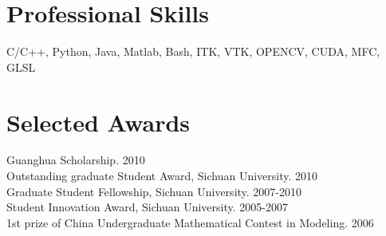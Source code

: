 \documentclass[line,margin]{res}
\begin{document}
\begin{resume}
\section{\sc Professional Skills}
\smallskip

C/C++, Python, Java, Matlab, Bash, ITK, VTK, OPENCV, CUDA, MFC, GLSL
 
\section{\sc Selected Awards}


Guanghua Scholarship.  \hfill       2010\\
Outstanding graduate Student Award, Sichuan University. \hfill       2010\\
Graduate Student Fellowship, Sichuan University.  \hfill       2007-2010\\
Student Innovation Award, Sichuan University.  \hfill        2005-2007 \\%
1st prize of China Undergraduate Mathematical Contest in Modeling.  \hfill       2006



\end{resume}

%
%
\end{document}
